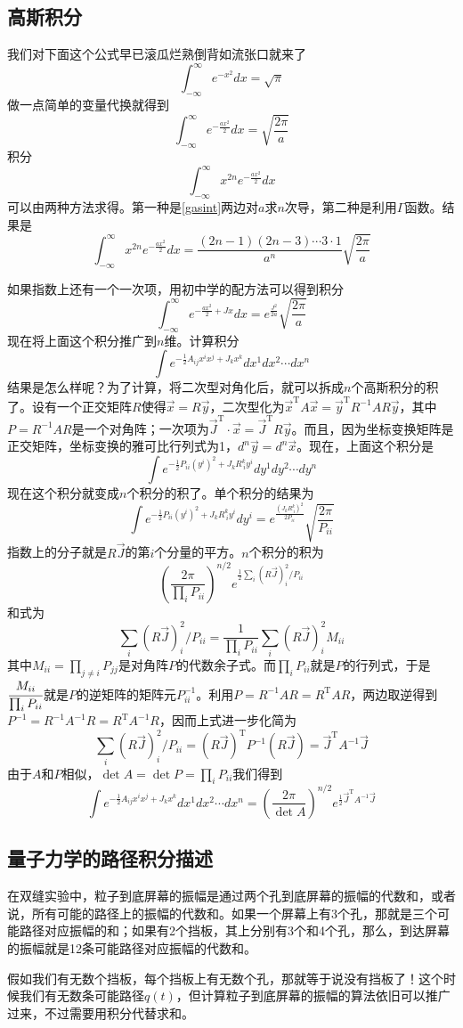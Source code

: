 \documentclass[a4paper,11pt]{ctexart}
\newcommand{\beq}{\begin{equation}}
\newcommand{\eeq}{\end{equation}}
\begin{document}
\subsection{高斯积分}
我们对下面这个公式早已滚瓜烂熟倒背如流张口就来了
\beq
\int_{-\infty}^{\infty} e^{-x^2} dx = \sqrt{\pi}
\eeq
做一点简单的变量代换就得到
\beq \label{gasint}
\int_{-\infty}^{\infty} e^{-\frac{ax^2}{2}} dx = \sqrt{\frac{2\pi}{a}}
\eeq
积分$$
\int_{-\infty}^{\infty} x^{2n} e^{-\frac{ax^2}{2}}dx
$$
可以由两种方法求得。第一种是\cref{gasint}两边对$a$求$n$次导，第二种是利用$\Gamma$函数。结果是
\beq
\int_{-\infty}^{\infty} x^{2n} e^{-\frac{ax^2}{2}}dx = \frac{(2n-1)(2n-3)\cdots 3\cdot 1}{a^n} \sqrt{\frac{2\pi}{a}}
\eeq
\par
如果指数上还有一个一次项，用初中学的配方法可以得到积分
\beq
\int_{-\infty}^{\infty} e^{-\frac{ax^2}{2} + Jx} dx = e^{\frac{J^2}{2a}} \sqrt{\frac{2\pi}{a}}
\eeq
现在将上面这个积分推广到$n$维。计算积分
$$ \int e^{- \frac{1}{2} A_{ij} x^i x^j + J_k x^k} dx^1 dx^2 \cdots dx^n$$
结果是怎么样呢？为了计算，将二次型对角化后，就可以拆成$n$个高斯积分的积了。设有一个正交矩阵$R$使得$\vec{x} = R\vec{y}$，二次型化为$\vec{x}^\mathrm{T} A \vec{x} = \vec{y}^\mathrm{T} R^{-1} A R \vec{y}$，其中$P = R^{-1} A R$是一个对角阵；一次项为$\vec{J}^\mathrm{T} \cdot \vec{x} = \vec{J}^\mathrm{T} R \vec{y}$。而且，因为坐标变换矩阵是正交矩阵，坐标变换的雅可比行列式为1，$d^n \vec{y} = d^n \vec{x}$。现在，上面这个积分是
\beq
\int e^{ - \frac{1}{2} P_{ii} (y^i)^2 + J_k R^k_{\ i} y^i} dy^1 dy^2 \cdots dy^n
\eeq
现在这个积分就变成$n$个积分的积了。单个积分的结果为
\beq
\int e^{ - \frac{1}{2} P_{ii} (y^i)^2 + J_k R^k_{\ i} y^i} dy^i = e^{\frac{(J_k R^k_{\ i})^2}{2P_{ii}}} \sqrt{\frac{2\pi}{P_{ii}}}
\eeq
指数上的分子就是$R\vec{J}$的第$i$个分量的平方。$n$个积分的积为
\beq
(\frac{2\pi}{\prod_i P_{ii}})^{n/2} e^{\frac{1}{2} \sum_i (R\vec{J})_i^2 / P_{ii}}
\eeq
和式为
\beq
\sum_i (R\vec{J})_i^2 / P_{ii}
=\frac{1}{\prod_i P_{ii}} \sum_i (R\vec{J})_i^2 M_{ii}
\eeq
其中$M_{ii} = \prod_{j \not= i} P_{jj}$是对角阵$P$的代数余子式。而$\prod_i P_{ii}$就是$P$的行列式，于是$\cfrac{M_{ii}}{\prod_i P_{ii}}$就是$P$的逆矩阵的矩阵元$P^{-1}_{ii}$。利用$P=R^{-1} A R = R^\mathrm{T} A R$，两边取逆得到$P^{-1} = R^{-1} A^{-1} R = R^\mathrm{T} A^{-1} R$，因而上式进一步化简为
\beq
\sum_i (R\vec{J})_i^2 / P_{ii} = (R \vec{J})^\mathrm{T} P^{-1} (R \vec{J}) = \vec{J}^\mathrm{T} A^{-1} \vec{J}
\eeq
由于$A$和$P$相似，$\det A = \det P =\prod_i P_{ii}$我们得到
\beq
\int e^{- \frac{1}{2} A_{ij} x^i x^j + J_k x^k} dx^1 dx^2 \cdots dx^n = (\frac{2\pi}{\det A})^{n/2} e^{\frac{1}{2} \vec{J}^\mathrm{T} A^{-1} \vec{J}}
\eeq

\subsection{量子力学的路径积分描述}
在双缝实验中，粒子到底屏幕的振幅是通过两个孔到底屏幕的振幅的代数和，或者说，所有可能的路径上的振幅的代数和。如果一个屏幕上有3个孔，那就是三个可能路径对应振幅的和；如果有2个挡板，其上分别有3个和4个孔，那么，到达屏幕的振幅就是12条可能路径对应振幅的代数和。
\par
假如我们有无数个挡板，每个挡板上有无数个孔，那就等于说没有挡板了！这个时候我们有无数条可能路径$q(t)$，但计算粒子到底屏幕的振幅的算法依旧可以推广过来，不过需要用积分代替求和。
\end{document}
